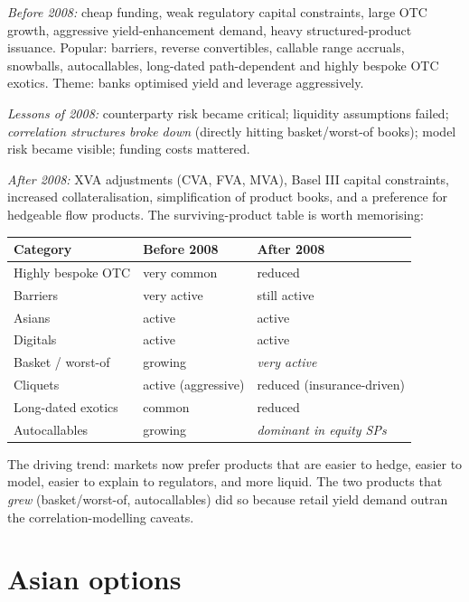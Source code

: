 \documentclass[11pt]{article}
\begin{document}
\noindent\emph{Before 2008:} cheap funding, weak regulatory capital constraints, large OTC growth,
aggressive yield-enhancement demand, heavy structured-product issuance. Popular: barriers, reverse
convertibles, callable range accruals, snowballs, autocallables, long-dated path-dependent and highly
bespoke OTC exotics. Theme: banks optimised yield and leverage aggressively.

\noindent\emph{Lessons of 2008:} counterparty risk became critical; liquidity assumptions failed;
\emph{correlation structures broke down} (directly hitting basket/worst-of books); model risk became
visible; funding costs mattered.

\noindent\emph{After 2008:} XVA adjustments (CVA, FVA, MVA), Basel III capital constraints, increased
collateralisation, simplification of product books, and a preference for hedgeable flow products. The
surviving-product table is worth memorising:

\begin{center}
\begin{tabular}{lll}
\hline
Category & Before 2008 & After 2008 \\
\hline
Highly bespoke OTC & very common & reduced \\
Barriers & very active & still active \\
Asians & active & active \\
Digitals & active & active \\
Basket / worst-of & growing & \emph{very active} \\
Cliquets & active (aggressive) & reduced (insurance-driven) \\
Long-dated exotics & common & reduced \\
Autocallables & growing & \emph{dominant in equity SPs} \\
\hline
\end{tabular}
\end{center}

\noindent The driving trend: markets now prefer products that are easier to hedge, easier to model,
easier to explain to regulators, and more liquid. The two products that \emph{grew} (basket/worst-of,
autocallables) did so because retail yield demand outran the correlation-modelling caveats.

\section{Asian options}
\end{document}

